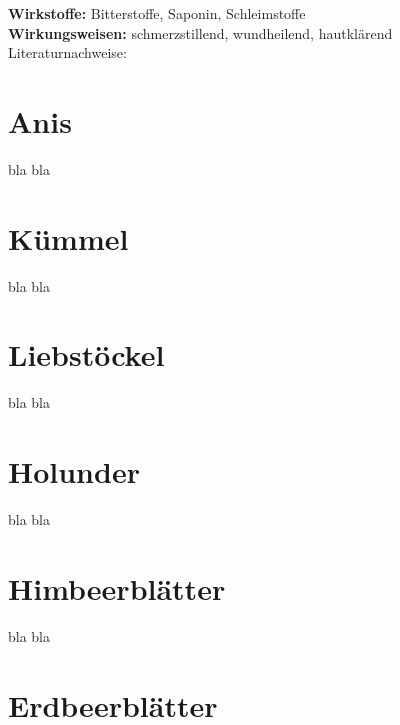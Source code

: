 \textbf{Wirkstoffe:} Bitterstoffe, Saponin, Schleimstoffe\\

\textbf{Wirkungsweisen:} schmerzstillend, wundheilend, hautklärend\\

Literaturnachweise: \cite{nedoma2018heilsalben}


\section{Anis}
\label{   }

bla bla


\section{Kümmel}
\label{   }

bla bla


\section{Liebstöckel}
\label{   }

bla bla


\section{Holunder}
\label{   }

bla bla



\section{Himbeerblätter}
\label{   }

bla bla



\section{Erdbeerblätter}
\label{   }

